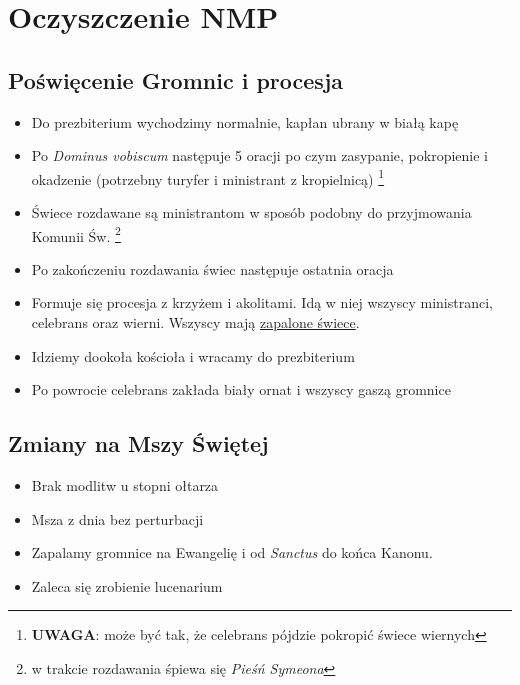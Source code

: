\chapter{Oczyszczenie NMP}

\section{Poświęcenie Gromnic i procesja}

\begin{itemize}
	\item Do prezbiterium wychodzimy normalnie, kapłan ubrany w białą kapę
	\item Po \textit{Dominus vobiscum} następuje 5 oracji po czym zasypanie,
	      pokropienie i okadzenie (potrzebny turyfer i ministrant z kropielnicą)
	      \footnote{\textbf{UWAGA}: może być tak, że celebrans pójdzie pokropić
		      świece wiernych}
	\item Świece rozdawane są ministrantom w sposób podobny do przyjmowania
	      Komunii Św.
	      \footnote{w trakcie rozdawania śpiewa się \textit{Pieśń Symeona}}
	\item Po zakończeniu rozdawania świec następuje ostatnia oracja
	\item Formuje się procesja z krzyżem i akolitami. Idą w niej wszyscy
	      ministranci, celebrans oraz  wierni. Wszyscy mają \underline{zapalone świece}.
	\item Idziemy dookoła kościoła i wracamy do prezbiterium
	\item Po powrocie celebrans zakłada biały ornat i wszyscy gaszą gromnice
\end{itemize}

\section{Zmiany na Mszy Świętej}

\begin{itemize}
	\item Brak modlitw u stopni ołtarza
	\item Msza z dnia bez perturbacji
	\item Zapalamy gromnice na Ewangelię i od \textit{Sanctus} do końca Kanonu.
	\item Zaleca się zrobienie lucenarium
\end{itemize}
